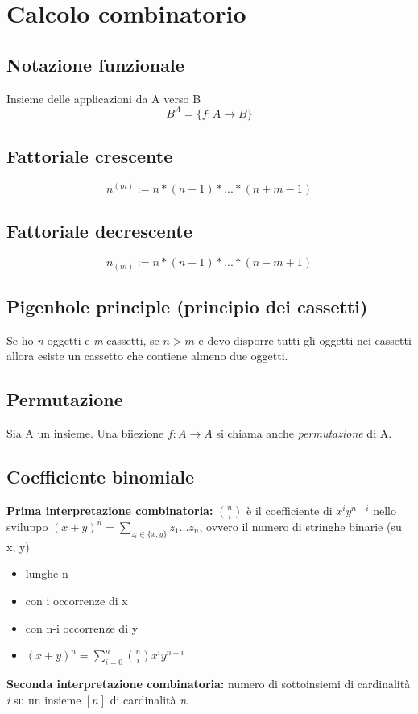 \section{Calcolo combinatorio}

\subsection{Notazione funzionale} 
Insieme delle applicazioni da A verso B
\[B^A=\{f:A\rightarrow B\}\]

\subsection{Fattoriale crescente} 
\[n^{(m)}:= n\ast (n+1)\ast ... \ast (n+m-1)\]

\subsection{Fattoriale decrescente} 
\[n_{(m)}:= n\ast (n-1)\ast ... \ast (n-m+1)\]

\subsection{Pigenhole principle (principio dei cassetti)} 
Se ho \textit{n} oggetti e \textit{m} cassetti, se \(n>m\) e devo disporre tutti gli oggetti nei cassetti allora esiste un cassetto che contiene almeno due oggetti.

\subsection{Permutazione} 
Sia A un insieme. Una biiezione \(f:A\rightarrow A\) si chiama anche \textit{permutazione} di A.

\subsection{Coefficiente binomiale}
\textbf{Prima interpretazione combinatoria:} \(\binom{n}{i}\) è il coefficiente di \(x^i y^{n-i}\) nello sviluppo \((x+y)^n=\sum _{z_i\in \{x,y\}} z_1 ...z_n\), ovvero il numero di stringhe binarie (su {x, y})
\begin{itemize}
    \item lunghe n
    \item con i occorrenze di x
    \item con n-i occorrenze di y
    \item \((x+y)^n =\sum _{i=0} ^n\binom{n}{i} x^iy^{n-i}\)
\end{itemize}
\noindent\textbf{Seconda interpretazione combinatoria:} numero di sottoinsiemi di cardinalità \textit{i} su un insieme \([n]\) di cardinalità \textit{n}.

